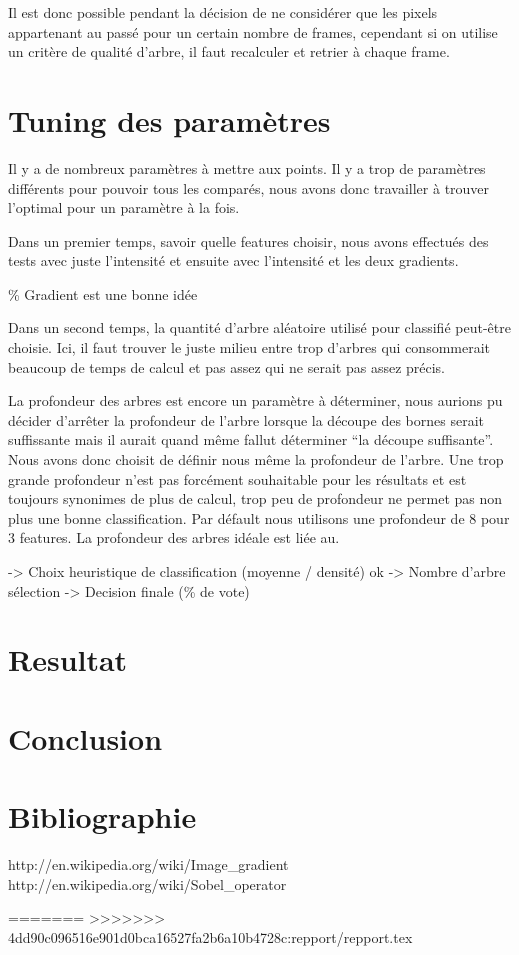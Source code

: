 \documentclass[11pt,a4paper]{report}
\begin{document}
			Il est donc possible pendant la décision de ne considérer que les pixels appartenant au passé pour un certain nombre de 
			frames, cependant si on utilise un critère de qualité d'arbre, il faut recalculer et retrier à chaque frame.

\section{Tuning des paramètres}
Il y a de nombreux paramètres à mettre aux points. Il y a trop de paramètres différents pour pouvoir tous les comparés, nous avons donc travailler à trouver l'optimal pour un paramètre à la fois. 

Dans un premier temps, savoir quelle features choisir, nous avons effectués des tests avec juste l'intensité et ensuite avec l'intensité et les deux gradients. 

\% Gradient est une bonne idée

Dans un second temps, la quantité d'arbre aléatoire utilisé pour classifié peut-être choisie. Ici, il faut trouver le juste milieu entre trop d'arbres qui consommerait beaucoup de temps de calcul et pas assez qui ne serait pas assez précis.

La profondeur des arbres est encore un paramètre à déterminer, nous aurions pu décider d'arrêter la profondeur de l'arbre lorsque la découpe des bornes serait suffissante mais il aurait quand même fallut déterminer ``la découpe suffisante''. Nous avons donc choisit de définir nous même la profondeur de l'arbre. Une trop grande profondeur n'est pas forcément souhaitable pour les résultats et est toujours synonimes de plus de calcul, trop peu de profondeur ne permet pas non plus une bonne classification. Par défault nous utilisons une profondeur de 8 pour 3 features. La profondeur des arbres idéale est liée au.

-> Choix heuristique de classification (moyenne / densité)  ok 
-> Nombre d'arbre sélection
-> Decision finale (\% de vote)

\section{Resultat}

\section{Conclusion}

	
	
\section{Bibliographie}	
\begin{thebibliography}{2}
    http://en.wikipedia.org/wiki/Image\_gradient
    http://en.wikipedia.org/wiki/Sobel\_operator
  
\end{thebibliography}






=======
>>>>>>> 4dd90c096516e901d0bca16527fa2b6a10b4728c:repport/repport.tex
\end{document}
